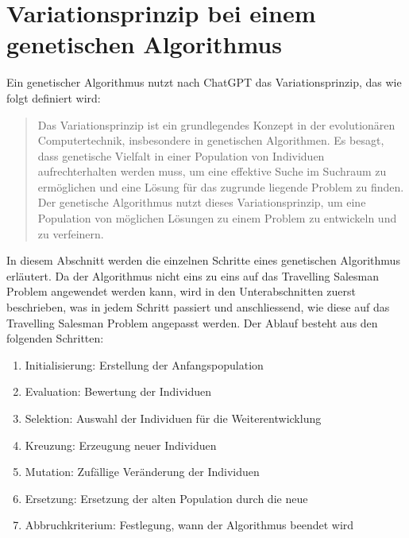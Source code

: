 %
%
%
%
\section{Variationsprinzip bei einem genetischen Algorithmus
\label{buch:paper:varalg:section:genetic_algorithm_process}}
Ein genetischer Algorithmus nutzt nach ChatGPT das Variationsprinzip, 
das wie folgt definiert wird:
\begin{quote}
Das Variationsprinzip ist ein grundlegendes Konzept in der 
evolutionären Computertechnik, insbesondere in genetischen 
Algorithmen. Es besagt, dass genetische Vielfalt in einer 
Population von Individuen aufrechterhalten werden muss, 
um eine effektive Suche im Suchraum zu ermöglichen und eine 
Lösung für das zugrunde liegende Problem zu finden.
\\
Der genetische Algorithmus nutzt dieses Variationsprinzip, um eine 
Population von möglichen Lösungen zu einem Problem zu entwickeln 
und zu verfeinern\cite{chatgpt2024}.
\end{quote}
In diesem Abschnitt werden die einzelnen Schritte eines genetischen Algorithmus 
erläutert. Da der Algorithmus nicht eins zu eins auf das Travelling Salesman
Problem angewendet werden kann, wird in den Unterabschnitten zuerst beschrieben,
was in jedem Schritt passiert und anschliessend, wie diese auf das Travelling 
Salesman Problem angepasst werden.
Der Ablauf besteht aus den folgenden Schritten:
\begin{enumerate}
    \item Initialisierung: Erstellung der Anfangspopulation
    \item Evaluation: Bewertung der Individuen
    \item Selektion: Auswahl der Individuen für die Weiterentwicklung
    \item Kreuzung: Erzeugung neuer Individuen
    \item Mutation: Zufällige Veränderung der Individuen
    \item Ersetzung: Ersetzung der alten Population durch die neue
    \item Abbruchkriterium: Festlegung, wann der Algorithmus beendet wird
\end{enumerate}








